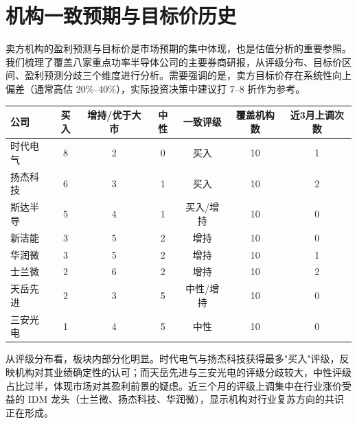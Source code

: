 
\section{机构一致预期与目标价历史}

卖方机构的盈利预测与目标价是市场预期的集中体现，也是估值分析的重要参照。我们梳理了覆盖八家重点功率半导体公司的主要券商研报，从评级分布、目标价区间、盈利预测分歧三个维度进行分析。需要强调的是，卖方目标价存在系统性向上偏差（通常高估 20\%–40\%），实际投资决策中建议打 7–8 折作为参考。

\begin{exhibitbox}[表 7-3：卖方评级分布与覆盖度统计]
\centering
\small
\begin{tabularx}{\textwidth}{l c c c c c c}
\toprule
\textbf{公司} & \textbf{买入} & \textbf{增持/优于大市} & \textbf{中性} & \textbf{一致评级} & \textbf{覆盖机构数} & \textbf{近3月上调次数} \\
\midrule
时代电气 & 8 & 2 & 0 & 买入 & 10 & 1 \\
扬杰科技 & 6 & 3 & 1 & 买入 & 10 & 2 \\
斯达半导 & 5 & 4 & 1 & 买入/增持 & 10 & 0 \\
新洁能 & 3 & 5 & 2 & 增持 & 10 & 0 \\
华润微 & 3 & 5 & 2 & 增持 & 10 & 1 \\
士兰微 & 2 & 6 & 2 & 增持 & 10 & 2 \\
天岳先进 & 2 & 3 & 5 & 中性/增持 & 10 & 0 \\
三安光电 & 1 & 4 & 5 & 中性 & 10 & 0 \\
\bottomrule
\end{tabularx}
\end{exhibitbox}

从评级分布看，板块内部分化明显。时代电气与扬杰科技获得最多"买入"评级，反映机构对其业绩确定性的认可；而天岳先进与三安光电的评级分歧较大，中性评级占比过半，体现市场对其盈利前景的疑虑。近三个月的评级上调集中在行业涨价受益的 IDM 龙头（士兰微、扬杰科技、华润微），显示机构对行业复苏方向的共识正在形成。

